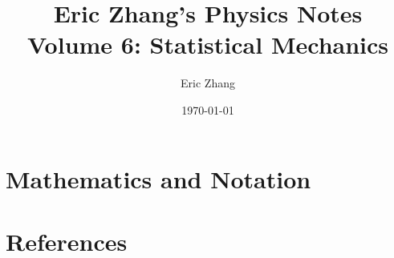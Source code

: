 \documentclass[a4paper, titlepage]{book}
\title{
    Eric Zhang's Physics Notes \\
    \large Volume 6: Statistical Mechanics
}
\author{Eric Zhang}
\date{\today}
\numberwithin{equation}{section}
\begin{document}
\frontmatter
\maketitle
\tableofcontents


\mainmatter


\appendix
\chapter{Mathematics and Notation}

\chapter{References}
\end{document}
